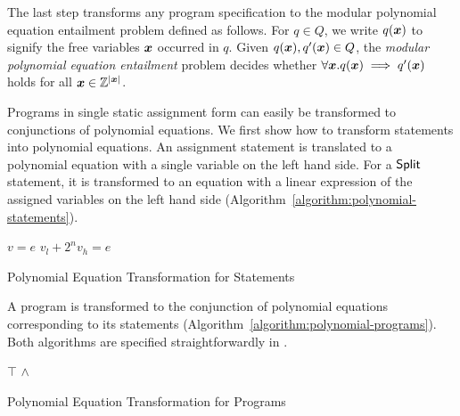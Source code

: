 
The last step transforms any program specification to the 
modular polynomial equation entailment problem defined as follows. For
$q \in Q$, we write $q(\vx)$ to signify the free variables $\vx$
occurred in $q$. Given $q(\vx), q'(\vx) \in Q$, the \emph{modular
  polynomial equation entailment} problem decides whether $\forall
\vx. q(\vx) \implies q'(\vx)$ holds for all $\vx \in \bbfZ^{|\vx|}$.

Programs in single static assignment form can easily be transformed to
conjunctions of polynomial equations. We first show how to transform
statements into polynomial equations. An assignment statement is
translated to a polynomial equation with a single variable on the left
hand side. For a $\mbox{\textsf{Split}}$ statement, it is transformed to an
equation with a linear expression of the assigned variables on the
left hand side (Algorithm~\ref{algorithm:polynomial-statements}). 
\begin{algorithm}
  \begin{algorithmic}[1]
        \Return $v = e$
      \EndCase
        \Return $v_l + 2^n v_h = e$
      \EndCase
    \EndMatch
    \EndFunction
  \end{algorithmic}
  \caption{Polynomial Equation Transformation for Statements}
  \label{algorithm:polynomial-statements}
\end{algorithm}


A program is transformed to the conjunction of polynomial
equations corresponding to its statements
(Algorithm~\ref{algorithm:polynomial-programs}). Both algorithms are
specified straightforwardly in \coq.

\begin{algorithm}
  \begin{algorithmic}[1]
      \Case{$\epsilon$} \Return $\top$ \EndCase
        \Return {} $\wedge$
      \EndCase
    \EndMatch
    \EndFunction
  \end{algorithmic}
  \caption{Polynomial Equation Transformation for Programs}
  \label{algorithm:polynomial-programs}
\end{algorithm}

